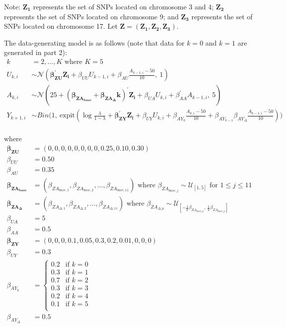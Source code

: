 \documentclass{article}
\begin{document}
\noindent Note: {$\boldsymbol{Z_1}$} represents the set of SNPs located on chromosome 3 and 4; $\boldsymbol{Z_2}$ represents the set of SNPs located on chromosome 9; and $\boldsymbol{Z_3}$ represents the set of SNPs located on chromosome 17. Let $\boldsymbol{Z}=(\boldsymbol{Z_1}, \boldsymbol{Z_2}, \boldsymbol{Z_3})$.

\newpage
\noindent The data-generating model is as follows (note that data for $k=0$ and $k=1$ are generated in part 2):\\
$$
\begin{aligned}
k&=2,\dots,K \text{ where } K=5\\
U_{k,i} &\sim \mathcal{N}\left(\boldsymbol{\beta_{ZU}^{'}Z_i} + \beta_{UU}U_{k-1,i} + {\beta_{AU}\frac{A_{k-1,i}-50}{10}}, \ 1 \right) \\
A_{k,i} &\sim \mathcal{N}\left(25+ \boldsymbol{(\beta_{ZA_{base}} + \beta_{ZA_\Delta}k)^{'}Z_i} + 
    \beta_{UA}U_{k,i} + \beta_{AA}^{'}A_{k-1,i}, \ 5 \right) \\
Y_{k+1,i} &\sim Bin\Bigg(1, \ \text{expit}\left(\log{\frac{\lambda}{1-\lambda}} + \boldsymbol{\beta_{ZY}^{'}Z_{i}} + 
    \beta_{UY}U_{k,i} +
    \beta_{AY_{k}}\frac{A_{k,i}-50}{10} +
    \beta_{AY_{k-1}}\beta_{AY_\Delta}\frac{A_{k-1,i}-50}{10}\right) \Bigg)\\ 
\end{aligned}
$$

\noindent where
$$
\begin{aligned}
\boldsymbol{\beta_{ZU}}&=(0, 0, 0, 0, 0, 0, 0, 0, 0.25, 0.10, 0.30)\\
\beta_{UU}&=0.50 \\
\beta_{AU}&=0.35 \\
\boldsymbol{\beta_{ZA_{base}}} &=(\beta_{ZA_{base,1}}, \beta_{ZA_{base,2}}, \dots, \beta_{ZA_{base,11}}) \text{ where } 
    \beta_{ZA_{base,j}}\sim\mathcal{U}_{[1,5]} \text{ for } 1\le j \le 11 \\
\boldsymbol{\beta_{ZA_\Delta}} &=(\beta_{ZA_{\Delta,1}}, \beta_{ZA_{\Delta,2}}, \dots, \beta_{ZA_{\Delta,11}}) \text{ where }
    \beta_{ZA_{\Delta,p}}\sim\mathcal{U}_{[-\frac{1}{k}\beta_{ZA_{base,p}}, \ \frac{1}{k}\beta_{ZA_{base,p}}]} \\ 
\beta_{UA}&=5 \\
\beta_{AA}&=0.5 \\
\boldsymbol{\beta_{ZY}} &=(0, 0, 0, 0.1, 0.05, 0.3, 0.2, 0.01, 0, 0, 0) \\
\beta_{UY}&=0.3  \\
\beta_{AY_{k}}&=\begin{cases}
    0.2 &\text{if } k=0 \\
    0.3 &\text{if } k=1 \\
    0.7 &\text{if } k=2 \\
    0.3 &\text{if } k=3 \\
    0.2 &\text{if } k=4 \\
    0.1 &\text{if } k=5 \\
\end{cases} \\
\beta_{AY_{\Delta}}&=0.5 \\
\end{aligned}
$$
\end{document}
